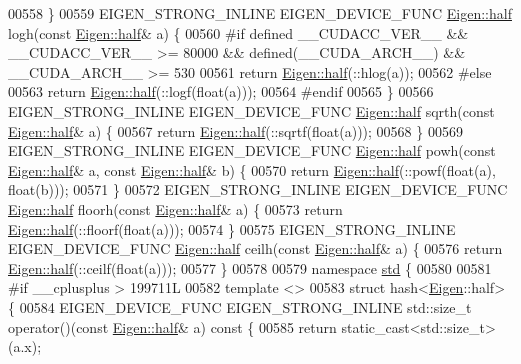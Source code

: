 \begin{DoxyCode}
00558 \}
00559 EIGEN\_STRONG\_INLINE EIGEN\_DEVICE\_FUNC \hyperlink{struct_eigen_1_1half}{Eigen::half} logh(\textcolor{keyword}{const} 
      \hyperlink{struct_eigen_1_1half}{Eigen::half}& a) \{
00560 \textcolor{preprocessor}{#if defined \_\_CUDACC\_VER\_\_ && \_\_CUDACC\_VER\_\_ >= 80000 && defined(\_\_CUDA\_ARCH\_\_) && \_\_CUDA\_ARCH\_\_ >= 530}
00561   \textcolor{keywordflow}{return} \hyperlink{struct_eigen_1_1half}{Eigen::half}(::hlog(a));
00562 \textcolor{preprocessor}{#else}
00563   \textcolor{keywordflow}{return} \hyperlink{struct_eigen_1_1half}{Eigen::half}(::logf(\textcolor{keywordtype}{float}(a)));
00564 \textcolor{preprocessor}{#endif}
00565 \}
00566 EIGEN\_STRONG\_INLINE EIGEN\_DEVICE\_FUNC \hyperlink{struct_eigen_1_1half}{Eigen::half} sqrth(\textcolor{keyword}{const} 
      \hyperlink{struct_eigen_1_1half}{Eigen::half}& a) \{
00567   \textcolor{keywordflow}{return} \hyperlink{struct_eigen_1_1half}{Eigen::half}(::sqrtf(\textcolor{keywordtype}{float}(a)));
00568 \}
00569 EIGEN\_STRONG\_INLINE EIGEN\_DEVICE\_FUNC \hyperlink{struct_eigen_1_1half}{Eigen::half} powh(\textcolor{keyword}{const} 
      \hyperlink{struct_eigen_1_1half}{Eigen::half}& a, \textcolor{keyword}{const} \hyperlink{struct_eigen_1_1half}{Eigen::half}& b) \{
00570   \textcolor{keywordflow}{return} \hyperlink{struct_eigen_1_1half}{Eigen::half}(::powf(\textcolor{keywordtype}{float}(a), \textcolor{keywordtype}{float}(b)));
00571 \}
00572 EIGEN\_STRONG\_INLINE EIGEN\_DEVICE\_FUNC \hyperlink{struct_eigen_1_1half}{Eigen::half} floorh(\textcolor{keyword}{const} 
      \hyperlink{struct_eigen_1_1half}{Eigen::half}& a) \{
00573   \textcolor{keywordflow}{return} \hyperlink{struct_eigen_1_1half}{Eigen::half}(::floorf(\textcolor{keywordtype}{float}(a)));
00574 \}
00575 EIGEN\_STRONG\_INLINE EIGEN\_DEVICE\_FUNC \hyperlink{struct_eigen_1_1half}{Eigen::half} ceilh(\textcolor{keyword}{const} 
      \hyperlink{struct_eigen_1_1half}{Eigen::half}& a) \{
00576   \textcolor{keywordflow}{return} \hyperlink{struct_eigen_1_1half}{Eigen::half}(::ceilf(\textcolor{keywordtype}{float}(a)));
00577 \}
00578 
00579 \textcolor{keyword}{namespace }\hyperlink{namespacestd}{std} \{
00580 
00581 \textcolor{preprocessor}{#if \_\_cplusplus > 199711L}
00582 \textcolor{keyword}{template} <>
00583 \textcolor{keyword}{struct }hash<\hyperlink{namespace_eigen}{Eigen}::half> \{
00584   EIGEN\_DEVICE\_FUNC EIGEN\_STRONG\_INLINE std::size\_t operator()(\textcolor{keyword}{const} \hyperlink{struct_eigen_1_1half}{Eigen::half}& a)\textcolor{keyword}{ const }\{
00585     \textcolor{keywordflow}{return} \textcolor{keyword}{static\_cast<}std::size\_t\textcolor{keyword}{>}(a.x);

\end{DoxyCode}
